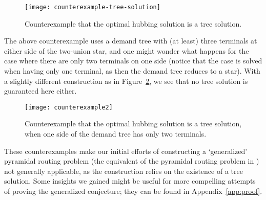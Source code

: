 \begin{figure}
    \centering
    \texttt{[image: counterexample-tree-solution]}
    \caption{Counterexample that the optimal hubbing solution is a tree solution.} \label{fig:counterex-tree-solution}
\end{figure}

The above counterexample uses a demand tree with (at least) three terminals at either side of the two-union star, and one might wonder what happens for the case where there are only two terminals on one side (notice that the case is solved when having only one terminal, as then the demand tree reduces to a star).
With a slightly different construction as in Figure~\ref{fig:counterex2}, we see that no tree solution is guaranteed here either. %

\begin{figure}
    \centering
    \texttt{[image: counterexample2]}
    \caption{Counterexample that the optimal hubbing solution is a tree solution, when one side of the demand tree has only two terminals.}
    \label{fig:counterex2}
\end{figure}

These counterexamples make our initial efforts of constructing a `generalized' pyramidal routing problem (the equivalent of the pyramidal routing problem in \cite{grandoni2008short}) not generally applicable, as the construction relies on the existence of a tree solution.
Some insights we gained might be useful for more compelling attempts of proving the generalized conjecture;
they can be found in Appendix~\ref{app:proof}.
